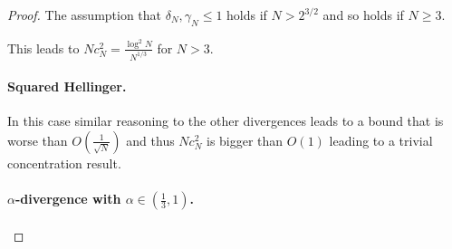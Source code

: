 \begin{proof}
The assumption that $\delta_N, \gamma_N \leq 1$ holds if $N>2^{3/2}$ and so holds if $N\geq3$.

This leads to $Nc_N^2 = \frac{\log^2N}{N^{1/3}}$ for $N> 3$.


\paragraph{Squared Hellinger.}

In this case similar reasoning to the other divergences leads to a bound that is worse than $O\left(\frac{1}{\sqrt{N}}\right)$ and thus $Nc^2_N$ is bigger than $O(1)$ leading to a trivial concentration result.

\paragraph{$\alpha$-divergence with $\alpha\in(\frac{1}{3},1)$.}


\end{proof}
